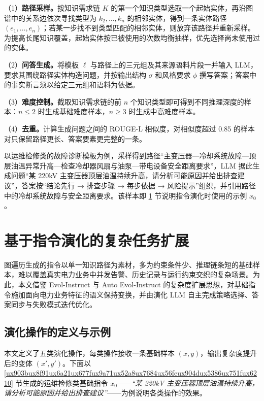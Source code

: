 \documentclass[fontset=fandol,type=master,campus=shenzhen,etitleauto=true]{hithesisbook}
\begin{document}
（1）\textbf{路径采样。}按知识需求链 $K$ 的第一个知识类型选取一个起始实体，再沿图谱中的关系边依次寻找类型为 $k_2, \ldots, k_n$ 的相邻实体，得到一条实体路径 $(e_1, \ldots, e_n)$；若某一步找不到类型匹配的相邻实体，则放弃该路径并重新采样。为提高长尾知识覆盖，起始实体按已被使用的次数均衡抽样，优先选择尚未使用过的实体。

（2）\textbf{问答生成。}将模板 $\ell$ 与路径上的三元组及其来源语料片段一并输入 LLM，要求其围绕路径实体构造问题，并按输出结构 $\sigma$ 和风格要求 $\phi$ 撰写答案；答案中的事实断言须以给定三元组和语料为依据。

（3）\textbf{难度控制。}截取知识需求链的前 $n$ 个知识类型即可得到不同推理深度的样本：$n \le 2$ 时生成基础难度样本，$n \ge 3$ 时生成中高难度样本。

（4）\textbf{去重。}计算生成问题之间的 ROUGE-L 相似度\cite{ref75}，对相似度超过 0.85 的样本对只保留路径更长、答案要素更完整的一条。

以运维检修类的故障诊断模板为例，采样得到路径“主变压器—冷却系统故障—顶层油温异常升高—检查冷却器风扇与油泵—带电设备安全距离要求”，LLM 据此生成问题“某 220kV 主变压器顶层油温持续升高，请分析可能原因并给出排查建议”，答案按“结论先行 → 排查步骤 → 每步依据 → 风险提示”组织，并引用路径中的冷却系统故障与安全距离要求。该样本即 \ref{ux57faux4e8eux6307ux4ee4ux6f14ux5316ux7684ux590dux6742ux4efbux52a1ux6269ux5c55} 节说明指令演化时使用的示例 $x_0$。

\section{基于指令演化的复杂任务扩展}\label{ux57faux4e8eux6307ux4ee4ux6f14ux5316ux7684ux590dux6742ux4efbux52a1ux6269ux5c55}

图遍历生成的指令以单一知识路径为素材，多为约束条件少、推理链条短的基础样本，难以覆盖真实电力业务中并发告警、历史记录与运行约束交织的复杂场景。为此，本文借鉴 Evol-Instruct\cite{ref25} 与 Auto Evol-Instruct\cite{ref53} 的复杂度扩展思想，对基础指令施加面向电力业务特征的语义保持变换，并由演化 LLM 自主完成策略选择、答案同步与失败模式迭代优化。

\subsection{演化操作的定义与示例}\label{ux9762ux5411ux4e03ux7c7bux6570ux636eux7c7bux578bux7684ux5deeux5f02ux5316ux6307ux4ee4ux6f14ux5316}

本文定义了五类演化操作，每类操作接收一条基础样本 $(x, y)$，输出复杂度提升后的变体 $(x', y')$。下面以 \ref{ux903bux8f91ux6a21ux677fux9a71ux52a8ux7684ux56feux904dux5386ux751fux6210} 节生成的运维检修类基础指令 $x_0$——\emph{“某 220kV 主变压器顶层油温持续升高，请分析可能原因并给出排查建议”}——为例说明各类操作的效果。
\end{document}
